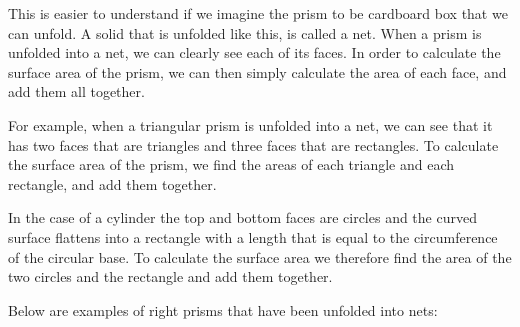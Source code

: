 This is easier to understand if we imagine the prism to be cardboard box that we can unfold.
A solid that is unfolded like this, is called a net. When a prism is unfolded into a net, we can clearly see each of its faces. In order to calculate the surface area of the prism, we can then simply calculate the area of each face, and add them all together.
\par 
{}

 For example, when a triangular prism is unfolded into a net, we can see that it has two faces that are
triangles and three faces that are rectangles. To calculate the surface area of the prism, we find the areas of each triangle and  each rectangle, and add them together.
  \par
In the case of a cylinder the top and bottom faces are circles and the curved surface flattens
into a rectangle with a length that is equal to the circumference of the circular base. To calculate the surface area we therefore find the area of the two circles and the rectangle and add them together.

\par
Below are examples of right prisms that have been unfolded into nets:

